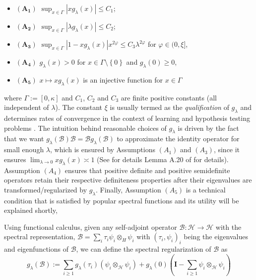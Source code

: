 \documentclass{article} %
\newcommand{\gl}{g_{\lambda}}
\newcommand{\SpectralAssumptionone}{A_{1}}
\newcommand{\SpectralAssumptiontwo}{A_{2}}
\newcommand{\SpectralAssumptionthree}{A_{3}}
\newcommand{\SpectralAssumptionfour}{A_{4}}
\newcommand{\SpectralAssumptionfive}{A_{5}}
\theoremstyle{plain}
\begin{document}
\begin{itemize}
    \item[] $\boldsymbol{(\SpectralAssumptionone)}$ $\sup _{x \in \Gamma}\left|x \gl(x)\right| \leq C_1$; \label{Assumption Spectral Regularizer A1}
    \item[] $\boldsymbol{(\SpectralAssumptiontwo)}$ $\sup _{x \in \Gamma}\left|\lambda \gl(x)\right| \leq C_2$; \label{Assumption Spectral Regularizer A2}
    \item[] $\boldsymbol{(\SpectralAssumptionthree)}$ $ \sup _{x \in \Gamma}\left|1-x \gl(x)\right| x^{2 \varphi} \leq C_3 \lambda^{2 \varphi}$ for $\varphi \in (0, \xi]$, \label{Assumption Spectral Regularizer A3}
    \item[] $\boldsymbol{(\SpectralAssumptionfour)}$ $ \gl(x) >0$ for $x \in \Gamma \setminus \left\{0\right\}$ and $\gl(0) \geq 0$, \label{Assumption Spectral Regularizer A4}
    \item[] $\boldsymbol{(\SpectralAssumptionfive)}$ $x \mapsto x \gl(x)$ is an injective function for $x \in \Gamma$ \label{Assumption Spectral Regularizer A5}
\end{itemize}
where $\Gamma:=[0, \kappa]$ and $C_1$, $C_2$ and $C_3$ are finite positive constants (all independent of $\lambda$). The constant $\xi$ is usually termed as the \emph{qualification} of $\gl$ and determines rates of convergence in the context of learning and hypothesis testing problems \citep{bauer2007regularization,hagrass2024spectral}. The intuition behind reasonable choices of $\gl$ is driven by the fact that we want $\gl(\mathcal{B})\mathcal{B} = \mathcal{B}\gl(\mathcal{B})$ to approximate the identity operator for small enough $\lambda$, which is ensured by Assumptions \hyperref[Assumption Spectral Regularizer A1]{$(\SpectralAssumptionone)$} and \hyperref[Assumption Spectral Regularizer A3]{$(\SpectralAssumptionthree)$}, since it ensures $\lim_{\lambda \to 0} x \gl(x) \asymp 1$ (See for details Lemma A.20 of \citet{hagrass2024spectral} for details). Assumption \hyperref[Assumption Spectral Regularizer A4]{$(\SpectralAssumptionfour)$} ensures that positive definite and positive semidefinite operators retain their respective definiteness properties after their eigenvalues are transformed/regularized by $\gl$. Finally, Assumption \hyperref[Assumption Spectral Regularizer A5]{$(\SpectralAssumptionfive)$} is a technical condition that is satisfied by popular spectral functions and its utility will be explained shortly, 

Using functional calculus, given any self-adjoint operator $\mathcal{B}: \mathcal{H} \to \mathcal{H}$ with the spectral representation, $\mathcal{B}=\sum_i \tau_i \psi_i \otimes_H \psi_i$ with $\left(\tau_i, \psi_i\right)_i$ being the eigenvalues and eigenfunctions of $\mathcal{B}$, we can define the spectral regularization of $\mathcal{B}$ as
\[
\gl(\mathcal{B}):=\sum_{i \geq 1} \gl\left(\tau_i\right)\left(\psi_i \otimes_{\mathcal{H}} \psi_i\right)+\gl(0)\left(\boldsymbol{I}-\sum_{i \geq 1} \psi_i \otimes_{\mathcal{H}} \psi_i\right)
\]
\end{document}
